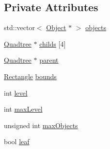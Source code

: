 \subsection*{Private Attributes}
\begin{DoxyCompactItemize}
\item 
std\+::vector$<$ \hyperlink{classZeta_1_1Object}{Object} $\ast$ $>$ \hyperlink{classZeta_1_1Quadtree_ab65f2fd401040f96f51fdfb4eb54dcc6}{objects}
\item 
\hyperlink{classZeta_1_1Quadtree}{Quadtree} $\ast$ \hyperlink{classZeta_1_1Quadtree_a5917b7519f54850f0600f49f713b2d60}{childs} \mbox{[}4\mbox{]}
\item 
\hyperlink{classZeta_1_1Quadtree}{Quadtree} $\ast$ \hyperlink{classZeta_1_1Quadtree_a27afc304ca92719e0616c388f7e79475}{parent}
\item 
\hyperlink{classZeta_1_1Rectangle}{Rectangle} \hyperlink{classZeta_1_1Quadtree_acf16413c75f2089560a1861360f01b8f}{bounds}
\item 
int \hyperlink{classZeta_1_1Quadtree_aff9fb924702a36cd3dd1d12bcf59d61a}{level}
\item 
int \hyperlink{classZeta_1_1Quadtree_a0b93f88a779c0cbc86be78a402f287eb}{max\+Level}
\item 
unsigned int \hyperlink{classZeta_1_1Quadtree_aa483835272c340ea1b0d5e97f4a6aafa}{max\+Objects}
\item 
bool \hyperlink{classZeta_1_1Quadtree_a53e74b3d83a27ae72fe4cc799d58c3e0}{leaf}
\end{DoxyCompactItemize}


